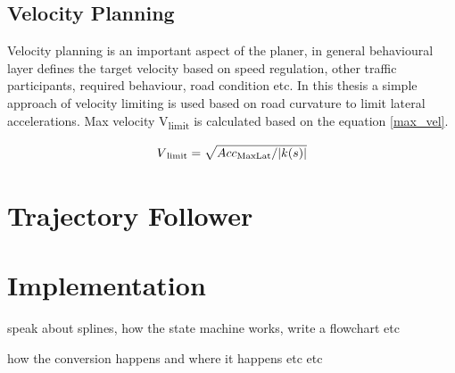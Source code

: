 \subsection{Velocity Planning}
Velocity planning is an important aspect of the planer, in general behavioural layer defines the target velocity based on speed regulation, other traffic participants, required behaviour, road condition etc. In this thesis a simple approach of velocity limiting is used based on road curvature to limit lateral accelerations. Max velocity  V\textsubscript{limit} is calculated based on the equation \ref{max_vel}. 

\begin{equation}
    V\textsubscript{limit} = \sqrt{Acc\textsubscript{MaxLat} / |k(s)|}
\label{max_vel}
\end{equation}

\section{Trajectory Follower} \label{traj_follower}


\section{Implementation} \label{implementation}

speak about splines, how the state machine works, write a flowchart etc

how the conversion happens and where it happens etc etc
